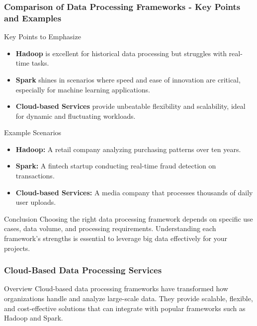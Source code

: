 \documentclass[aspectratio=169]{beamer}
\begin{document}
\begin{frame}[fragile]
    \frametitle{Comparison of Data Processing Frameworks - Key Points and Examples}
    \begin{block}{Key Points to Emphasize}
        \begin{itemize}
            \item \textbf{Hadoop} is excellent for historical data processing but struggles with real-time tasks.
            \item \textbf{Spark} shines in scenarios where speed and ease of innovation are critical, especially for machine learning applications.
            \item \textbf{Cloud-based Services} provide unbeatable flexibility and scalability, ideal for dynamic and fluctuating workloads.
        \end{itemize}
    \end{block}
    
    \begin{block}{Example Scenarios}
        \begin{itemize}
            \item \textbf{Hadoop:} A retail company analyzing purchasing patterns over ten years.
            \item \textbf{Spark:} A fintech startup conducting real-time fraud detection on transactions.
            \item \textbf{Cloud-based Services:} A media company that processes thousands of daily user uploads.
        \end{itemize}
    \end{block}

    \begin{block}{Conclusion}
        Choosing the right data processing framework depends on specific use cases, data volume, and processing requirements. 
        Understanding each framework's strengths is essential to leverage big data effectively for your projects.
    \end{block}
\end{frame}

\begin{frame}[fragile]
    \frametitle{Cloud-Based Data Processing Services}
    \begin{block}{Overview}
        Cloud-based data processing frameworks have transformed how organizations handle and analyze large-scale data. 
        They provide scalable, flexible, and cost-effective solutions that can integrate with popular frameworks such as Hadoop and Spark.
    \end{block}
\end{frame}
\end{document}
